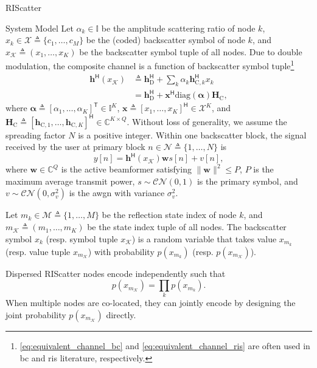 \begin{section}{RIScatter}
\begin{subsection}{System Model}
		Let $\alpha_k \in \mathbb{I}$ be the amplitude scattering ratio of node $k$, $x_k \in \mathcal{X} \triangleq \{c_1,\ldots,c_M\}$ be the (coded) backscatter symbol of node $k$, and $x_{\mathcal{K}} \triangleq (x_1,\ldots,x_K)$ be the backscatter symbol tuple of all nodes.
		Due to double modulation, the composite channel is a function of backscatter symbol tuple\footnote{\eqref{eq:equivalent_channel_bc} and \eqref{eq:equivalent_channel_ris} are often used in \gls{bc} and \gls{ris} literature, respectively.}
		\begin{subequations}
			\label{eq:equivalent_channel}
			\begin{align}
				\mathbf{h}^\mathsf{H}(x_{\mathcal{K}})
				 & \triangleq \mathbf{h}_{\text{D}}^\mathsf{H} + \sum_{k} \alpha_k \mathbf{h}_{\text{C},k}^\mathsf{H} x_k \label{eq:equivalent_channel_bc}                    \\
				 & = \mathbf{h}_{\text{D}}^\mathsf{H} + \mathbf{x}^\mathsf{H} \mathrm{diag}(\mathbf{\alpha}) \mathbf{H}_{\text{C}}, \label{eq:equivalent_channel_ris}
			\end{align}
		\end{subequations}
		where $\mathbf{\alpha} \triangleq [\alpha_1,\ldots,\alpha_K]^\mathsf{T} \in \mathbb{I}^{K}$, $\mathbf{x} \triangleq [x_1,\ldots,x_K]^\mathsf{H} \in \mathcal{X}^{K}$, and $\mathbf{H}_{\text{C}} \triangleq [\mathbf{h}_{\text{C},1},\ldots,\mathbf{h}_{\text{C},K}]^\mathsf{H} \in \mathbb{C}^{K \times Q}$.
		Without loss of generality, we assume the spreading factor $N$ is a positive integer.
		Within one backscatter block, the signal received by the user at primary block $n \in \mathcal{N} \triangleq \{1,\ldots,N\}$ is
		\begin{equation}
			y[n] = \mathbf{h}^\mathsf{H}(x_{\mathcal{K}}) \mathbf{w} s[n] + v[n],
			\label{eq:receive_signal}
		\end{equation}
		where $\mathbf{w} \in \mathbb{C}^{Q}$ is the active beamformer satisfying $\lVert \mathbf{w} \rVert^2 \le P$, $P$ is the maximum average transmit power, $s \sim \mathcal{CN}(0,1)$ is the primary symbol, and $v \sim \mathcal{CN}(0,\sigma_v^2)$ is the \gls{awgn} with variance $\sigma_v^2$.

		Let $m_k \in \mathcal{M} \triangleq \{1,\ldots,M\}$ be the reflection state index of node $k$, and $m_{\mathcal{K}} \triangleq (m_1,\ldots,m_K)$ be the state index tuple of all nodes.
		The backscatter symbol $x_k$ (resp. symbol tuple $x_{\mathcal{K}}$) is a random variable that takes value $x_{m_k}$ (resp. value tuple $x_{m_{\mathcal{K}}}$) with probability $p(x_{m_k})$ (resp. $p(x_{m_{\mathcal{K}}})$).
		\begin{remark}
			Dispersed RIScatter nodes encode independently such that
			\begin{equation}
				p(x_{m_{\mathcal{K}}}) = \prod_k p(x_{m_k}).
				\label{eq:equivalent_distribution}
			\end{equation}
			When multiple nodes are co-located, they can jointly encode by designing the joint probability $p(x_{m_{\mathcal{K}}})$ directly.
			\label{rm:independent_encoding}
		\end{remark}


\end{subsection}
\end{section}
